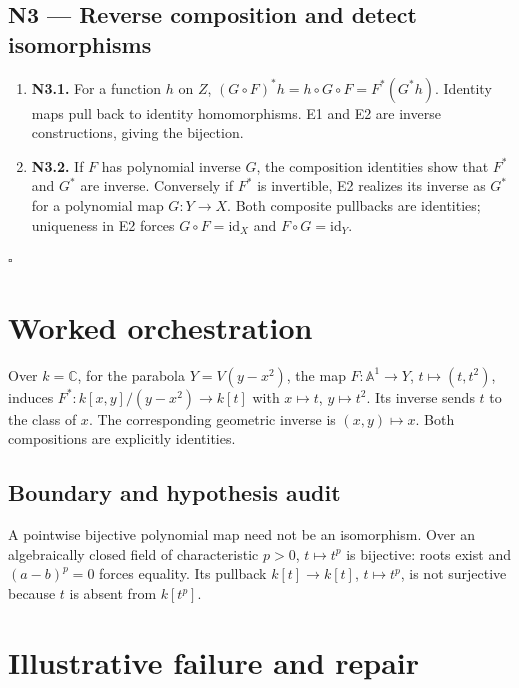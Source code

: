 \documentclass[preprint,12pt,aps,pra,showkeys,amsmath,amssymb,superscriptaddress,floatfix]{revtex4-2}
\theoremstyle{definition}
\theoremstyle{remark}
\begin{document}
\subsection{N3 --- Reverse composition and detect
isomorphisms}\label{n3-reverse-composition-and-detect-isomorphisms}

\begin{enumerate}
\def\labelenumi{\arabic{enumi}.}
\item
  \textbf{N3.1.} For a function \(h\) on \(Z\),
  \((G\circ F)^*h=h\circ G\circ F=F^*(G^*h)\). Identity maps pull back
  to identity homomorphisms. E1 and E2 are inverse constructions, giving
  the bijection.
\item
  \textbf{N3.2.} If \(F\) has polynomial inverse \(G\), the composition
  identities show that \(F^*\) and \(G^*\) are inverse. Conversely if
  \(F^*\) is invertible, E2 realizes its inverse as \(G^*\) for a
  polynomial map \(G:Y\to X\). Both composite pullbacks are identities;
  uniqueness in E2 forces \(G\circ F=\mathrm{id}_X\) and
  \(F\circ G=\mathrm{id}_Y\).
\end{enumerate}

\hfill$\square$

\section{Worked orchestration}

Over \(k=\mathbb C\), for the parabola \(Y=V(y-x^2)\), the map
\(F:\mathbb A^1\to Y\), \(t\mapsto(t,t^2)\), induces
\(F^*:k[x,y]/(y-x^2)\to k[t]\) with \(x\mapsto t\), \(y\mapsto t^2\).
Its inverse sends \(t\) to the class of \(x\). The corresponding
geometric inverse is \((x,y)\mapsto x\). Both compositions are
explicitly identities.

\subsection{Boundary and hypothesis audit}

A pointwise bijective polynomial map need not be an isomorphism. Over an
algebraically closed field of characteristic \(p>0\), \(t\mapsto t^p\)
is bijective: roots exist and \((a-b)^p=0\) forces equality. Its
pullback \(k[t]\to k[t]\), \(t\mapsto t^p\), is not surjective because
\(t\) is absent from \(k[t^p]\).

\section{Illustrative failure and repair}
\end{document}
